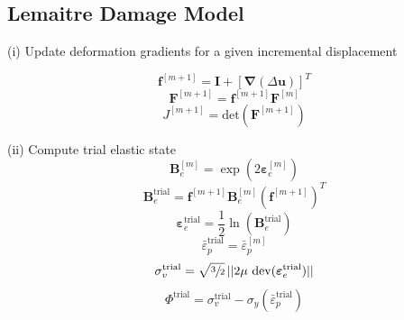 \documentclass[sn-mathphys,Numbered]{sn-jnl}%
\newcommand{\bb}{\boldsymbol}
\begin{document}
\begin{appendices}
\subsection{Lemaitre Damage Model}



\begin{algorithm}[htbp] \label{alg:lemaitre} \footnotesize
\SetAlgoLined
(i) Update deformation gradients for a given incremental displacement

\begin{equation}
  \bb{f}^{[m+1]} = \bb{I} + \left[ \bb{\nabla}(\Delta\textbf{u}) \right]^T \nonumber
\end{equation}
\begin{equation}
  \bb{F}^{[m+1]} = \bb{f}^{[m+1]} \bb{F}^{[m]}  \nonumber
\end{equation}
\begin{equation}
  J^{[m+1]} = \text{det} \left( \bb{F}^{[m+1]} \right) \nonumber
\end{equation}

(ii) Compute trial elastic state
\begin{equation}
\bb{B}_{e}^{[m]} = \exp\left({2\boldsymbol{\varepsilon}_{e}^{[m]}}\right) \nonumber
\end{equation}
\begin{equation}
\bb{B}_{e}^{\text{trial}} = \bb{f}^{[m+1]}  \bb{B}_{e}^{[m]}  \left(\bb{f}^{[m+1]}\right)^{T}\nonumber
\end{equation}
\begin{equation}
\boldsymbol{\varepsilon}_{e}^{\text{trial}} = \frac{1}{2} \ln(\textbf{B}_{e}^{\text{trial}}) \nonumber
\end{equation}
\begin{equation}
\bar{\varepsilon}^{\text{trial}}_p = \bar{\varepsilon}^{[m]}_p \nonumber
\end{equation}
\begin{equation}
\sigma_{v}^{\text{trial}} = \sqrt{\sfrac{3}{2}} \, || 2\mu\ \text{dev}(\boldsymbol{\varepsilon}_{e}^{\text{trial}})|| \nonumber
\end{equation}
\begin{equation}
\Phi^{\text{trial}} =  \sigma_{v}^{\text{trial}} - \sigma_{y}(\bar{\varepsilon}^{\text{trial}}_p) \nonumber 
\end{equation}


\end{algorithm}
\end{appendices}
\end{document}
